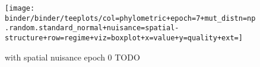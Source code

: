 \begin{figure*}
  \centering
  \texttt{[image: binder/binder/teeplots/col=phylometric+epoch=7+mut\_distn=np.random.standard\_normal+nuisance=spatial-structure+row=regime+viz=boxplot+x=value+y=quality+ext=]}
  \caption{with spatial nuisance epoch 0 TODO}
  \label{fig:reconstructed-tree-phylometrics-with-spatial-nuisance-epoch0}
\end{figure*}
